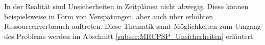 In der Realität sind Unsicherheiten in Zeitplänen nicht abwegig. Diese können beispielsweise in Form von Verspätungen, aber auch über erhöhten Ressourcenverbrauch auftreten. Diese Thematik samt Möglichkeiten zum Umgang des Problems werden im Abschnitt \ref{subsec:MRCPSP_Unsicherheiten} erläutert. 





